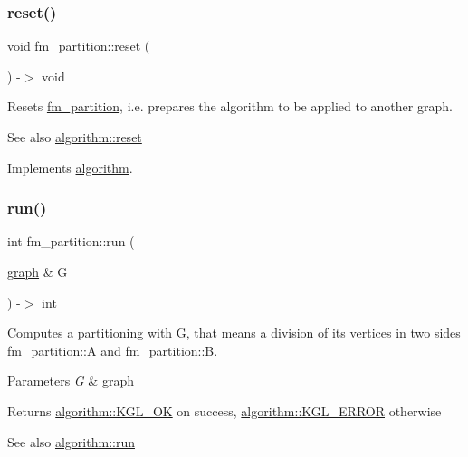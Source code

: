 \subsubsection{\texorpdfstring{reset()}{reset()}}
{\footnotesize\ttfamily void fm\+\_\+partition\+::reset (\begin{DoxyParamCaption}{ }\end{DoxyParamCaption}) -\/$>$ void\hspace{0.3cm}{\ttfamily [virtual]}}

Resets \mbox{\hyperlink{classfm__partition}{fm\+\_\+partition}}, i.\+e. prepares the algorithm to be applied to another graph.

\begin{DoxySeeAlso}{See also}
\mbox{\hyperlink{classalgorithm_aea645f2e39976a477c8f8564656fd1b6}{algorithm\+::reset}} 
\end{DoxySeeAlso}


Implements \mbox{\hyperlink{classalgorithm_aea645f2e39976a477c8f8564656fd1b6}{algorithm}}.

\mbox{\label{classfm__partition_a509615ef1f11bc2334a96c35adafd28e}} 
\subsubsection{\texorpdfstring{run()}{run()}}
{\footnotesize\ttfamily int fm\+\_\+partition\+::run (\begin{DoxyParamCaption}\item[{\mbox{\hyperlink{classgraph}{graph}} \&}]{G }\end{DoxyParamCaption}) -\/$>$ int\hspace{0.3cm}{\ttfamily [virtual]}}

Computes a partitioning with {\ttfamily G}, that means a division of its vertices in two sides {\ttfamily \mbox{\hyperlink{classfm__partition_a973d30e9eb0d21f659ef288176cd4791}{fm\+\_\+partition\+::A}} } and {\ttfamily \mbox{\hyperlink{classfm__partition_a42515c44eecb7ba3e2ec549a877ef238}{fm\+\_\+partition\+::B}}}.


\begin{DoxyParams}{Parameters}
{\em G} & graph \\
\hline
\end{DoxyParams}
\begin{DoxyReturn}{Returns}
{\ttfamily \mbox{\hyperlink{classalgorithm_af1a0078e153aa99c24f9bdf0d97f6710aae4c1cd7fe8d8cf4b143241a6e7c31cf}{algorithm\+::\+K\+G\+L\+\_\+\+OK}}} on success, {\ttfamily \mbox{\hyperlink{classalgorithm_af1a0078e153aa99c24f9bdf0d97f6710ae67bf27b2ef31f73e545a7f9f4a69556}{algorithm\+::\+K\+G\+L\+\_\+\+E\+R\+R\+OR}}} otherwise 
\end{DoxyReturn}
\begin{DoxySeeAlso}{See also}
\mbox{\hyperlink{classalgorithm_a482eb28cacba018b5a86d3a819a50a2f}{algorithm\+::run}} 
\end{DoxySeeAlso}


